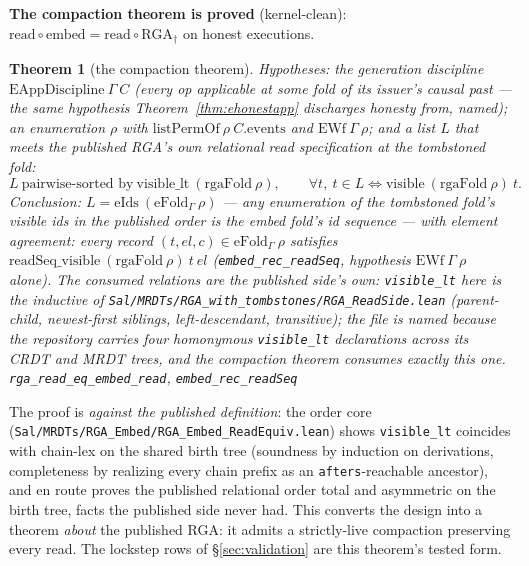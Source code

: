 \documentclass[11pt]{article}
\newtheorem{theorem}{Theorem}[section]
\newcommand{\lean}[1]{\texttt{#1}}
\newcommand{\code}[1]{\texttt{#1}}
\begin{document}
\noindent\textbf{The compaction theorem is proved} (kernel-clean): $\mathrm{read} \circ \mathrm{embed} = \mathrm{read}
\circ \mathrm{RGA}_\dagger$ on honest executions.

\begin{theorem}[the compaction theorem]
\label{thm:compactread}
Hypotheses: the generation discipline $\mathrm{EAppDiscipline}\
\Gamma\ C$ (every op applicable at some fold of its issuer's causal
past --- the same hypothesis Theorem~\ref{thm:ehonestapp}
discharges honesty from, named); an enumeration $\rho$ with
$\mathrm{listPermOf}\ \rho\ C.\mathrm{events}$ and $\mathrm{EWf}\
\Gamma\ \rho$; and a list $L$ that meets the published RGA's own
relational read specification at the tombstoned fold:
\[
  L\ \text{pairwise-sorted by}\
  \mathrm{visible\_lt}\ (\mathrm{rgaFold}\ \rho),
  \qquad
  \forall t,\ t \in L \iff
  \mathrm{visible}\ (\mathrm{rgaFold}\ \rho)\ t .
\]
Conclusion: $L = \mathrm{eIds}\ (\mathrm{eFold}_\Gamma\ \rho)$ ---
\emph{any} enumeration of the tombstoned fold's visible ids in the
published order is the embed fold's id sequence --- with element
agreement: every record $(t, \mathit{el}, c) \in
\mathrm{eFold}_\Gamma\ \rho$ satisfies
$\mathrm{readSeq\_visible}\ (\mathrm{rgaFold}\ \rho)\ t\
\mathit{el}$ (\lean{embed\_rec\_readSeq}, hypothesis $\mathrm{EWf}\
\Gamma\ \rho$ alone). The consumed relations are the published
side's own: \lean{visible\_lt} here is the inductive of
\code{Sal/MRDTs/RGA\_with\_tombstones/RGA\_ReadSide.lean}
(parent-child, newest-first siblings, left-descendant, transitive);
the file is named because the repository carries four homonymous
\lean{visible\_lt} declarations across its CRDT and MRDT trees, and
the compaction theorem consumes exactly this one.
\hfill\lean{rga\_read\_eq\_embed\_read},
\lean{embed\_rec\_readSeq}
\end{theorem}

\noindent The proof is \emph{against the published definition}: the
order core
(\code{Sal/MRDTs/RGA\_Embed/RGA\_Embed\_ReadEquiv.lean}) shows
\code{visible\_lt} coincides with chain-lex on the shared birth tree
(soundness by induction on derivations, completeness by realizing
every chain prefix as an \code{afters}-reachable ancestor), and en
route proves the published relational order total and asymmetric on
the birth tree, facts the published side never had. This converts
the design into a theorem \emph{about} the published RGA: it admits a
strictly-live compaction preserving every read. The lockstep rows of
\S\ref{sec:validation} are this theorem's tested form.
\end{document}
